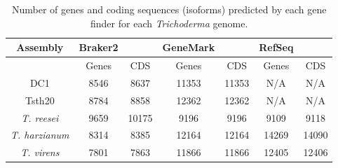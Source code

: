 \begin{table}
  \centering
  \begin{tabular}{|c|c|c|c|c|c|c|}
    \hline
    Assembly & Braker2 & & GeneMark & & RefSeq & \\ \hline
     & Genes & CDS & Genes & CDS & Genes & CDS \\ \hline
    DC1 & 8546 & 8637 & 11353 & 11353 & N/A & N/A \\ \hline
    Tsth20 & 8784 & 8858 & 12362 & 12362 & N/A & N/A \\ \hline
    \textit{T. reesei} & 9659 & 10175 & 9196 & 9196 & 9109 & 9118 \\ \hline
    \textit{T. harzianum} & 8314 & 8385 & 12164 & 12164 & 14269 & 14090 \\ \hline
    \textit{T. virens} & 7801 & 7863 & 11866 & 11866 & 12405 & 12406 \\ \hline
  \end{tabular}
  \caption[Gene prediction counts]{Number of genes and coding sequences
    (isoforms) predicted by each gene finder for each
    \textit{Trichoderma} genome.}
  \label{table:gene-counts}
\end{table}


